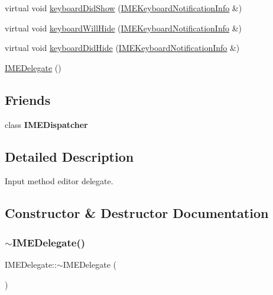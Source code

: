 \begin{DoxyCompactItemize}
virtual void \hyperlink{classIMEDelegate_aaf4d7a4f595decda8ffa2637c9a12b37}{keyboard\+Did\+Show} (\hyperlink{structIMEKeyboardNotificationInfo}{I\+M\+E\+Keyboard\+Notification\+Info} \&)
\item 
virtual void \hyperlink{classIMEDelegate_ab5c220c67ac7617ae9e9d2d14e6b34b3}{keyboard\+Will\+Hide} (\hyperlink{structIMEKeyboardNotificationInfo}{I\+M\+E\+Keyboard\+Notification\+Info} \&)
\item 
virtual void \hyperlink{classIMEDelegate_a8d30a7809e4d55cd9e6b4b377c21b5fe}{keyboard\+Did\+Hide} (\hyperlink{structIMEKeyboardNotificationInfo}{I\+M\+E\+Keyboard\+Notification\+Info} \&)
\item 
\hyperlink{classIMEDelegate_a582ac580b4478c68bfa045ddc2f8e67a}{I\+M\+E\+Delegate} ()
\end{DoxyCompactItemize}
\subsection*{Friends}
\begin{DoxyCompactItemize}
\item 
\mbox{\label{classIMEDelegate_a5dfe32183bbd23923ca4254ceb074a9e}} 
class {\bfseries I\+M\+E\+Dispatcher}
\end{DoxyCompactItemize}


\subsection{Detailed Description}
Input method editor delegate. 

\subsection{Constructor \& Destructor Documentation}
\mbox{\label{classIMEDelegate_a06608d3afb55159c131943e270725a1a}} 
\subsubsection{\texorpdfstring{$\sim$\+I\+M\+E\+Delegate()}{~IMEDelegate()}\hspace{0.1cm}{\footnotesize\ttfamily [1/2]}}
{\footnotesize\ttfamily I\+M\+E\+Delegate\+::$\sim$\+I\+M\+E\+Delegate (\begin{DoxyParamCaption}{ }\end{DoxyParamCaption})\hspace{0.3cm}{\ttfamily [virtual]}}

